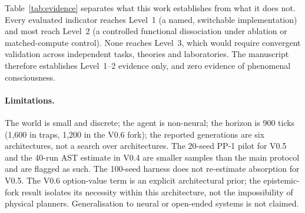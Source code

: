 \documentclass[11pt,a4paper]{article}
\begin{document}
Table~\ref{tab:evidence} separates what this work establishes from what it does not. Every evaluated
indicator reaches Level~1 (a named, switchable implementation) and most reach Level~2 (a controlled
functional dissociation under ablation or matched-compute control). None reaches Level~3, which would
require convergent validation across independent tasks, theories and laboratories. The manuscript
therefore establishes Level~1--2 evidence only, and zero evidence of phenomenal consciousness.

\begin{table}[t]
\centering
\small
\caption{Three-level evidence classification for the evaluated indicators. Level~1 is implementation;
Level~2 is controlled functional validation in this sandbox; Level~3 is broad theoretical validation
across independent tasks, theories and laboratories. This work claims Level~1--2 only.}
\label{tab:evidence}
\end{table}

\paragraph{Limitations.}
The world is small and discrete; the agent is non-neural; the horizon is 900 ticks (1{,}600 in traps, 1{,}200 in the V0.6 fork); the reported generations are six architectures, not a search over architectures. The 20-seed PP-1 pilot for V0.5 and the 40-run AST estimate in V0.4 are smaller samples than the main protocol and are flagged as such. The 100-seed harness does not re-estimate absorption for V0.5. The V0.6 option-value term is an explicit architectural prior; the epistemic-fork result isolates its necessity within this architecture, not the impossibility of physical planners. Generalisation to neural or open-ended systems is not claimed.
\end{document}
